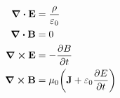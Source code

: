 \begin{align}
    \div{\vb{E}} &= \frac{\rho}{\varepsilon_0} \\
    \div{\vb{B}} &= 0 \\
    \curl{\vb{E}} &= -\pdv{B}{t}\\
    \label{eq:DisplayMath}\curl{\vb{B}} &= \mu_0\qty(\vb{J} + \varepsilon_0 \pdv{E}{t})
\end{align}